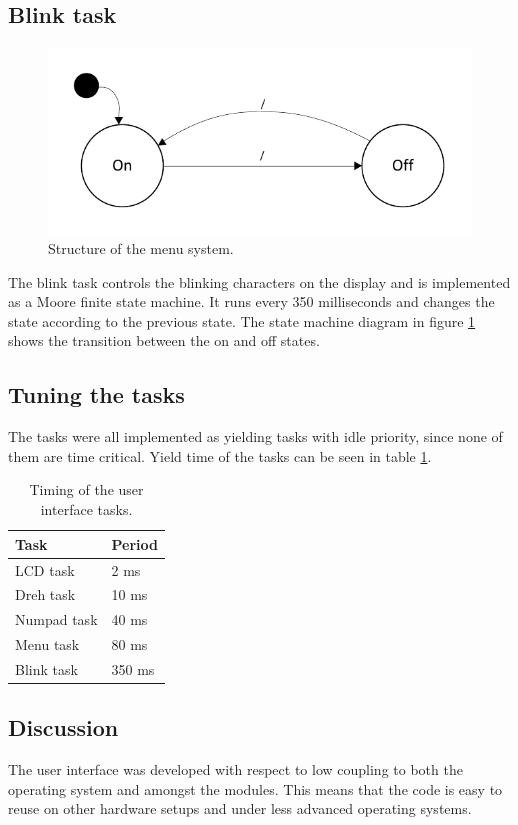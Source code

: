 \subsection{Blink task}
\begin{figure}[htb]
	\centering
	\includegraphics[scale=0.9,trim=0 15 0 15]{graphics/blink_task_fsm.pdf} 
	\caption{Structure of the menu system.}
	\label{fig:blink_task_fsm}
\end{figure}
The blink task controls the blinking characters on the display and is implemented as a Moore finite state machine. It runs every 350 milliseconds and changes the state according to the previous state. The state machine diagram in figure \ref{fig:blink_task_fsm} shows the transition between the on and off states.

\subsection{Tuning the tasks}
The tasks were all implemented as yielding tasks with idle priority, since none of them are time critical. Yield time of the tasks can be seen in table \ref{tab:ui_task_timing}.

\begin{table}[htb]	
	\centering
	\begin{tabular}{ll}					
	Task & Period \\					
	\midrule							
LCD task & 2 ms \\
Dreh task  & 10 ms \\
Numpad task & 40 ms \\
Menu task & 80 ms \\
Blink task & 350 ms \\
	\end{tabular}
	\caption{Timing of the user interface tasks.}	
	\label{tab:ui_task_timing}				
\end{table}

\subsection{Discussion}
The user interface was developed with respect to low coupling to both the operating system and amongst the modules. This means that the code is easy to reuse on other hardware setups and under less advanced operating systems. 

